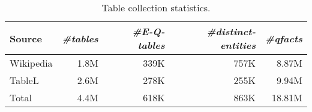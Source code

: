 \begin{table}[t]
	\centering
		\caption{Table collection statistics.}
	\label{tab:stats}
	\vspace{\tsq}
		\begin{tabular}{l|rrrr} 
			    \hline
	    Source & \textit{\#tables} & \textit{\#E-Q-tables} & \textit{\#distinct-entities} & \textit{\#qfacts}\\
			    \hline
		  Wikipedia & 1.8M & 339K  & 757K  & 8.87M \\
		 TableL & 2.6M & 278K  & 255K & 9.94M \\
		 \hline
		 Total & 4.4M & 618K  & 863K & 18.81M \\
			    \hline
		\end{tabular}
\end{table}
